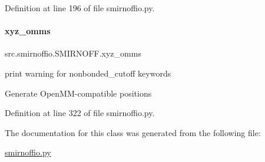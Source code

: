 Definition at line 196 of file smirnoffio.\+py.

\mbox{\label{classsrc_1_1smirnoffio_1_1SMIRNOFF_a817c140385e54c6610e28166c7baccdd}} 
\paragraph{\texorpdfstring{xyz\+\_\+omms}{xyz\_omms}}
{\footnotesize\ttfamily src.\+smirnoffio.\+S\+M\+I\+R\+N\+O\+F\+F.\+xyz\+\_\+omms}



print warning for \textquotesingle{}nonbonded\+\_\+cutoff\textquotesingle{} keywords 

Generate Open\+M\+M-\/compatible positions 

Definition at line 322 of file smirnoffio.\+py.



The documentation for this class was generated from the following file\+:\begin{DoxyCompactItemize}
\item 
\hyperlink{smirnoffio_8py}{smirnoffio.\+py}\end{DoxyCompactItemize}
